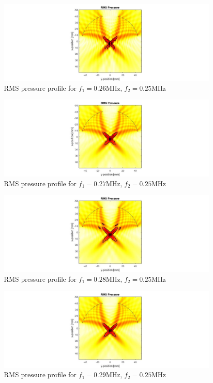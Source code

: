 \documentclass[10pt,a4paper]{article}
\begin{document}
\begin{figure}[!h]
\hspace*{-5cm}                                                    
\includegraphics[scale=0.6]{f260kHz}
\caption{RMS pressure profile for $f_1 = 0.26$MHz, $f_2 = 0.25$MHz}
\end{figure}
\begin{figure}[!h]
\hspace*{-5cm}                                                    
\includegraphics[scale=0.6]{f270kHz}
\caption{RMS pressure profile for $f_1 = 0.27$MHz, $f_2 = 0.25$MHz}
\end{figure}
\begin{figure}[!h]
\hspace*{-5cm}                                                    
\includegraphics[scale=0.6]{f280kHz}
\caption{RMS pressure profile for $f_1 = 0.28$MHz, $f_2 = 0.25$MHz}
\end{figure}
\begin{figure}[!h]
\hspace*{-5cm}                                                    
\includegraphics[scale=0.6]{f290kHz}
\caption{RMS pressure profile for $f_1 = 0.29$MHz, $f_2 = 0.25$MHz}
\end{figure}
\end{document}

